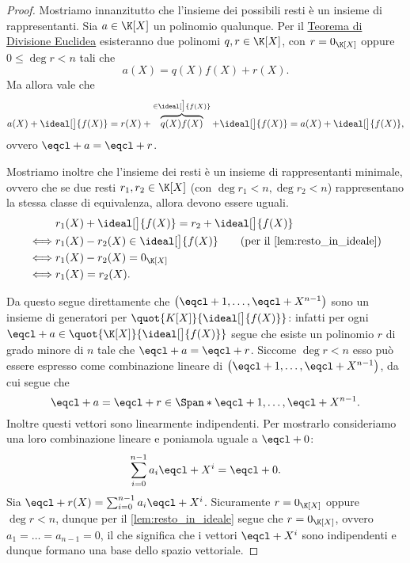 \begin{proof}
    Mostriamo innanzitutto che l'insieme dei possibili resti è un insieme di rappresentanti. Sia $a \in \K[X]$ un polinomio qualunque. Per il \hyperref[th:divisione_euclidea_KX]{Teorema di Divisione Euclidea} esisteranno due polinomi $q, r \in \K[X]$, con $r = 0_{\K[X]}$ oppure $0 \leq \deg r < n$ tali che \[
        a(X) = q(X)f(X) + r(X).    
    \] Ma allora vale che \[
        a(X) + \ideal[\big]{f(X)} = r(X) + \overbrace{q(X)f(X)}^{\in \ideal[\big]{f(X)}} +  \ideal[\big]{f(X)} = a(X) + \ideal[\big]{f(X)},
    \] ovvero $\eqcl+ a = \eqcl+ r$.

    Mostriamo inoltre che l'insieme dei resti è un insieme di rappresentanti minimale, ovvero che se due resti $r_1, r_2 \in \K[X]$ (con $\deg r_1 < n, \deg r_2 < n$) rappresentano la stessa classe di equivalenza, allora devono essere uguali.
    \begin{align*}
        &r_1(X) + \ideal[\big]{f(X)} = r_2 + \ideal[\big]{f(X)} \\
        \iff &r_1(X) - r_2(X) \in \ideal[\big]{f(X)} \tag{per il \autoref{lem:resto_in_ideale}}\\
        \iff &r_1(X) - r_2(X) = 0_{\K[X]}\\
        \iff &r_1(X) = r_2(X).
    \end{align*}

    Da questo segue direttamente che $\left( \eqcl+ 1, \dots, \eqcl+{X^{n-1}} \right)$ sono un insieme di generatori per $\quot{K[X]}{\ideal[\big]{f(X)}}$: infatti per ogni $\eqcl+ a \in \quot{\K[X]}{\ideal[\big]{f(X)}}$ segue che esiste un polinomio $r$ di grado minore di $n$ tale che $\eqcl+ a = \eqcl+ r$. Siccome $\deg r < n$ esso può essere espresso come combinazione lineare di $\left( \eqcl+ 1, \dots, \eqcl+{X^{n-1}} \right)$, da cui segue che \[
        \eqcl+ a = \eqcl+ r \in \Span*{\eqcl+ 1, \dots, \eqcl+{X^{n-1}}}.
    \] Inoltre questi vettori sono linearmente indipendenti. Per mostrarlo consideriamo una loro combinazione lineare e poniamola uguale a $\eqcl+ 0$: \begin{align*}
        \sum_{i = 0}^{n-1} a_i\eqcl+{X^i} = \eqcl+ 0.
    \end{align*} Sia $\eqcl+{r(X)} = \sum_{i = 0}^{n-1} a_i\eqcl+{X^i}$. Sicuramente $r = 0_{\K[X]}$ oppure $\deg r < n$, dunque per il \autoref{lem:resto_in_ideale} segue che $r = 0_{\K[X]}$, ovvero $a_1 = \dots = a_{n-1} = 0$, il che significa che i vettori $\eqcl+{X^i}$ sono indipendenti e dunque formano una base dello spazio vettoriale.
\end{proof}

